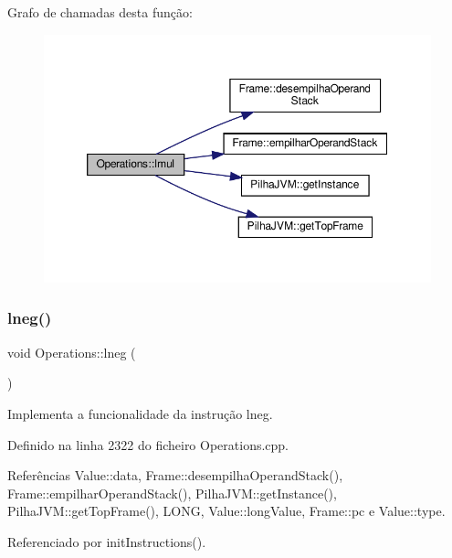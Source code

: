 Grafo de chamadas desta função\+:
\nopagebreak
\begin{figure}[H]
\begin{center}
\leavevmode
\includegraphics[width=350pt]{classOperations_ae23a8dfdcc02432b6f880334fa4a7c59_cgraph}
\end{center}
\end{figure}
\mbox{\label{classOperations_a0a14cc7ee880b5d5f1c3b532e8e2117c}} 
\subsubsection{\texorpdfstring{lneg()}{lneg()}}
{\footnotesize\ttfamily void Operations\+::lneg (\begin{DoxyParamCaption}{ }\end{DoxyParamCaption})\hspace{0.3cm}{\ttfamily [private]}}



Implementa a funcionalidade da instrução lneg. 



Definido na linha 2322 do ficheiro Operations.\+cpp.



Referências Value\+::data, Frame\+::desempilha\+Operand\+Stack(), Frame\+::empilhar\+Operand\+Stack(), Pilha\+J\+V\+M\+::get\+Instance(), Pilha\+J\+V\+M\+::get\+Top\+Frame(), L\+O\+NG, Value\+::long\+Value, Frame\+::pc e Value\+::type.



Referenciado por init\+Instructions().

